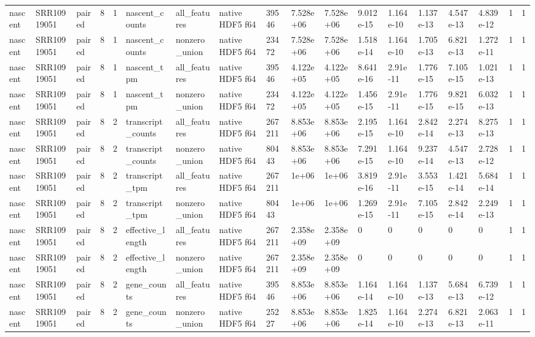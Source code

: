 \begin{tabular}{llllllllllllllllll}
nascent & SRR10919051 & paired & 8 & 1 & nascent\_counts & all\_features & native HDF5 f64 & 39546 & 7.528e+06 & 7.528e+06 & 9.012e-15 & 1.164e-10 & 1.137e-13 & 4.547e-13 & 4.839e-12 & 1 & 1 \\
nascent & SRR10919051 & paired & 8 & 1 & nascent\_counts & nonzero\_union & native HDF5 f64 & 23472 & 7.528e+06 & 7.528e+06 & 1.518e-14 & 1.164e-10 & 1.705e-13 & 6.821e-13 & 1.272e-11 & 1 & 1 \\
nascent & SRR10919051 & paired & 8 & 1 & nascent\_tpm & all\_features & native HDF5 f64 & 39546 & 4.122e+05 & 4.122e+05 & 8.641e-16 & 2.91e-11 & 1.776e-15 & 7.105e-15 & 1.021e-13 & 1 & 1 \\
nascent & SRR10919051 & paired & 8 & 1 & nascent\_tpm & nonzero\_union & native HDF5 f64 & 23472 & 4.122e+05 & 4.122e+05 & 1.456e-15 & 2.91e-11 & 1.776e-15 & 9.821e-15 & 6.032e-13 & 1 & 1 \\
nascent & SRR10919051 & paired & 8 & 2 & transcript\_counts & all\_features & native HDF5 f64 & 267211 & 8.853e+06 & 8.853e+06 & 2.195e-15 & 1.164e-10 & 2.842e-14 & 2.274e-13 & 8.275e-13 & 1 & 1 \\
nascent & SRR10919051 & paired & 8 & 2 & transcript\_counts & nonzero\_union & native HDF5 f64 & 80443 & 8.853e+06 & 8.853e+06 & 7.291e-15 & 1.164e-10 & 9.237e-14 & 4.547e-13 & 2.728e-12 & 1 & 1 \\
nascent & SRR10919051 & paired & 8 & 2 & transcript\_tpm & all\_features & native HDF5 f64 & 267211 & 1e+06 & 1e+06 & 3.819e-16 & 2.91e-11 & 3.553e-15 & 1.421e-14 & 5.684e-14 & 1 & 1 \\
nascent & SRR10919051 & paired & 8 & 2 & transcript\_tpm & nonzero\_union & native HDF5 f64 & 80443 & 1e+06 & 1e+06 & 1.269e-15 & 2.91e-11 & 7.105e-15 & 2.842e-14 & 2.249e-13 & 1 & 1 \\
nascent & SRR10919051 & paired & 8 & 2 & effective\_length & all\_features & native HDF5 f64 & 267211 & 2.358e+09 & 2.358e+09 & 0 & 0 & 0 & 0 & 0 & 1 & 1 \\
nascent & SRR10919051 & paired & 8 & 2 & effective\_length & nonzero\_union & native HDF5 f64 & 267211 & 2.358e+09 & 2.358e+09 & 0 & 0 & 0 & 0 & 0 & 1 & 1 \\
nascent & SRR10919051 & paired & 8 & 2 & gene\_counts & all\_features & native HDF5 f64 & 39546 & 8.853e+06 & 8.853e+06 & 1.164e-14 & 1.164e-10 & 1.137e-13 & 5.684e-13 & 6.739e-12 & 1 & 1 \\
nascent & SRR10919051 & paired & 8 & 2 & gene\_counts & nonzero\_union & native HDF5 f64 & 25227 & 8.853e+06 & 8.853e+06 & 1.825e-14 & 1.164e-10 & 2.274e-13 & 6.821e-13 & 2.063e-11 & 1 & 1 \\

\end{tabular}
